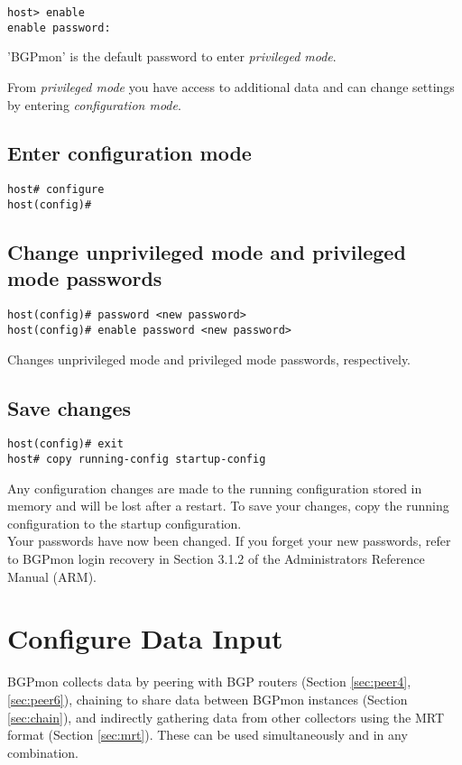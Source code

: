 \documentclass{article}
\begin{document}
\begin{Verbatim}[frame=single]
host> enable
enable password: 
\end{Verbatim}

'BGPmon' is the default password to enter \emph{privileged mode}.

From \emph{privileged mode} you have access to additional data and can change settings by entering \emph{configuration mode}.  

\subsection{Enter configuration mode}
\begin{Verbatim}[frame=single]
host# configure
host(config)#
\end{Verbatim}


\subsection{Change unprivileged mode and privileged mode passwords}
\begin{Verbatim}[frame=single]
host(config)# password <new password>
host(config)# enable password <new password>
\end{Verbatim}
Changes unprivileged mode and privileged mode passwords, respectively.

\subsection{Save changes}
\begin{Verbatim}[frame=single]
host(config)# exit
host# copy running-config startup-config
\end{Verbatim}
Any configuration changes are made to the running configuration stored in memory and will be lost after a restart.   To save your changes,  copy the running configuration to the startup configuration.\\
Your passwords have now been changed.   If you forget your new passwords,  refer to BGPmon login recovery in Section 3.1.2 of the Administrators Reference Manual (ARM).    \\

\section{Configure Data Input}
\label{sec:input}
BGPmon collects data by peering with BGP routers (Section \ref{sec:peer4},\ref{sec:peer6}),  chaining to share data between BGPmon instances (Section \ref{sec:chain}), and indirectly gathering data from other collectors using the MRT format (Section \ref{sec:mrt}).    These can be used simultaneously and in any combination.
\end{document}
